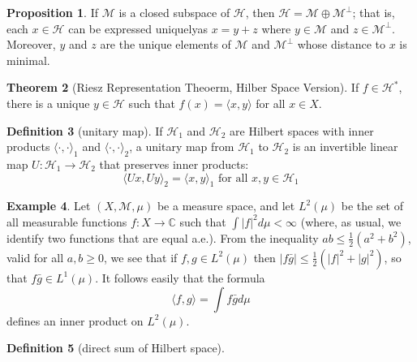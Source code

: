 \documentclass[12pt,a4paper]{book}
\theoremstyle{definition}
\newtheorem{defn}{Definition}[section]
\newtheorem{theo}[defn]{Theorem}
\newtheorem{prop}[defn]{Proposition}
\newtheorem{exam}[defn]{Example}
\begin{document}
\begin{prop}
    If $\mathcal{M}$ is a closed subspace of $\mathcal{H}$, then $\mathcal{H}=\mathcal{M} \oplus \mathcal{M}^{\perp}$; that is, each $x \in \mathcal{H}$ can be expressed uniquelyas $x=y+z$ where $y \in \mathcal{M}$ and $z \in \mathcal{M}^{\perp}$. Moreover, $y$ and $z$ are the unique elements of $\mathcal{M}$ and $\mathcal{M}^{\perp}$ whose distance to $x$ is minimal.
\end{prop}
\begin{theo}[Riesz Representation Theoerm, Hilber Space Version]
    If $f \in \mathcal{H}^*$, there is a unique $y \in \mathcal{H}$ such that $f(x)=\langle x, y\rangle$ for all $x \in X$.
\end{theo}
\begin{defn}[unitary map]
    If $\mathcal{H}_1$ and $\mathcal{H}_2$ are Hilbert spaces with inner products $\langle\cdot, \cdot\rangle_1$ and $\langle\cdot, \cdot\rangle_2$, 
    a unitary map from $\mathcal{H}_1$ to $\mathcal{H}_2$ is an invertible linear map $U: \mathcal{H}_1 \rightarrow \mathcal{H}_2$ that preserves inner products:
    $$
    \langle U x, U y\rangle_2=\langle x, y\rangle_1 \text { for all } x, y \in \mathcal{H}_1
    $$
\end{defn}
\begin{exam}
    Let $(X, \mathcal{M}, \mu)$ be a measure space, and let $L^2(\mu)$ be the set of all measurable functions $f: X \rightarrow \mathbb{C}$ such that $\int|f|^2 d \mu<\infty$ (where, as usual, we identify two functions that are equal a.e.). 
    From the inequality $a b \leq \frac{1}{2}\left(a^2+b^2\right)$, valid for all $a, b \geq 0$, we see that if $f, g \in L^2(\mu)$ then $|f \bar{g}| \leq \frac{1}{2}\left(|f|^2+|g|^2\right)$, so that $f \bar{g} \in L^1(\mu)$. It follows easily that the formula
    $$
    \langle f, g\rangle=\int f \bar{g} d \mu
    $$
    defines an inner product on $L^2(\mu)$.
\end{exam}
\begin{defn}[direct sum of Hilbert space]
    
\end{defn}
\end{document}
